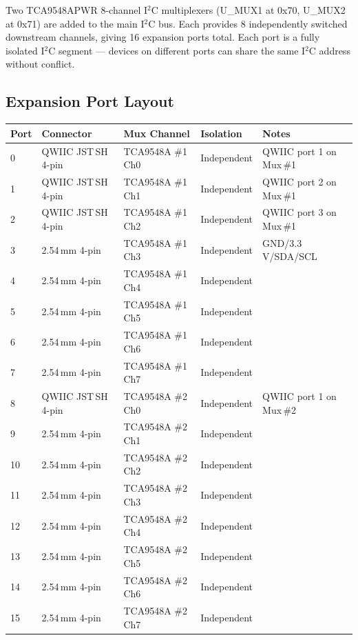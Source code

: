 \documentclass[11pt,a4paper]{article}
\begin{document}
Two TCA9548APWR 8-channel I$^2$C multiplexers (U\_MUX1 at 0x70, U\_MUX2 at 0x71) are added to the main I$^2$C bus. Each provides 8 independently switched downstream channels, giving 16 expansion ports total. Each port is a fully isolated I$^2$C segment --- devices on different ports can share the same I$^2$C address without conflict.

\subsection{Expansion Port Layout}

\begin{longtable}{p{1.2cm} p{3.5cm} p{3.5cm} p{2.5cm} p{4cm}}
  \toprule
  \rowcolor{headergray}\color{white}\textbf{Port} &
  \color{white}\textbf{Connector} &
  \color{white}\textbf{Mux Channel} &
  \color{white}\textbf{Isolation} &
  \color{white}\textbf{Notes} \\
  \midrule\endhead
  0  & QWIIC JST\,SH 4-pin & TCA9548A \#1 Ch0 & Independent & QWIIC port 1 on Mux\,\#1 \\
  1  & QWIIC JST\,SH 4-pin & TCA9548A \#1 Ch1 & Independent & QWIIC port 2 on Mux\,\#1 \\
  2  & QWIIC JST\,SH 4-pin & TCA9548A \#1 Ch2 & Independent & QWIIC port 3 on Mux\,\#1 \\
  3  & 2.54\,mm 4-pin      & TCA9548A \#1 Ch3 & Independent & GND/3.3\,V/SDA/SCL \\
  4  & 2.54\,mm 4-pin      & TCA9548A \#1 Ch4 & Independent & \\
  5  & 2.54\,mm 4-pin      & TCA9548A \#1 Ch5 & Independent & \\
  6  & 2.54\,mm 4-pin      & TCA9548A \#1 Ch6 & Independent & \\
  7  & 2.54\,mm 4-pin      & TCA9548A \#1 Ch7 & Independent & \\
  8  & QWIIC JST\,SH 4-pin & TCA9548A \#2 Ch0 & Independent & QWIIC port 1 on Mux\,\#2 \\
  9  & 2.54\,mm 4-pin      & TCA9548A \#2 Ch1 & Independent & \\
  10 & 2.54\,mm 4-pin      & TCA9548A \#2 Ch2 & Independent & \\
  11 & 2.54\,mm 4-pin      & TCA9548A \#2 Ch3 & Independent & \\
  12 & 2.54\,mm 4-pin      & TCA9548A \#2 Ch4 & Independent & \\
  13 & 2.54\,mm 4-pin      & TCA9548A \#2 Ch5 & Independent & \\
  14 & 2.54\,mm 4-pin      & TCA9548A \#2 Ch6 & Independent & \\
  15 & 2.54\,mm 4-pin      & TCA9548A \#2 Ch7 & Independent & \\
  \bottomrule
\end{longtable}
\end{document}
